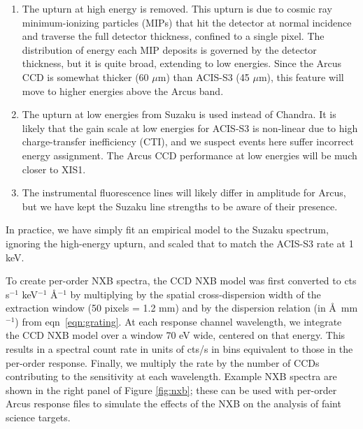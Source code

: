 \documentclass[12pt]{spieman}  %
\begin{document}
\begin{spacing}{2}
\begin{enumerate}
    \item The upturn at high energy is removed. This upturn is due to cosmic ray minimum-ionizing particles (MIPs) that hit the detector at normal incidence and traverse the full detector thickness, confined to a single pixel. The distribution of energy each MIP deposits is governed by the detector thickness, but it is quite broad, extending to low energies. Since the Arcus CCD is somewhat thicker (60 $\mu$m) than ACIS-S3 (45 $\mu$m), this feature will move to higher energies above the Arcus band.
    \item The upturn at low energies from Suzaku is used instead of Chandra. It is likely that the gain scale at low energies for ACIS-S3 is non-linear due to high charge-transfer inefficiency (CTI), and we suspect events here suffer incorrect energy assignment. The Arcus CCD performance at low energies will be much closer to XIS1.
    \item The instrumental fluorescence lines will likely differ in amplitude for Arcus, but we have kept the Suzaku line strengths to be aware of their presence.
\end{enumerate}

In practice, we have simply fit an empirical model to the Suzaku spectrum, ignoring the high-energy upturn, and scaled that to match the ACIS-S3 rate at 1 keV.

To create per-order NXB spectra, the CCD NXB model was first converted to cts s$^{-1}$ keV$^{-1}$ \AA$^{-1}$ by multiplying by the spatial cross-dispersion width of the extraction window (50 pixels = 1.2 mm) and by the dispersion relation (in \AA\ mm$^{-1}$) from eqn~\ref{eqn:grating}.  At each response channel wavelength, we integrate the CCD NXB model over a window 70 eV wide, centered on that energy. This results in a spectral count rate in units of cts/s in bins equivalent to those in the per-order response. Finally, we multiply the rate by the number of CCDs contributing to the sensitivity at each wavelength. Example NXB spectra are shown in the right panel of Figure \ref{fig:nxb}; these can be used with per-order Arcus response files to simulate the effects of the NXB on the analysis of faint science targets.




\end{spacing}
\end{document}
